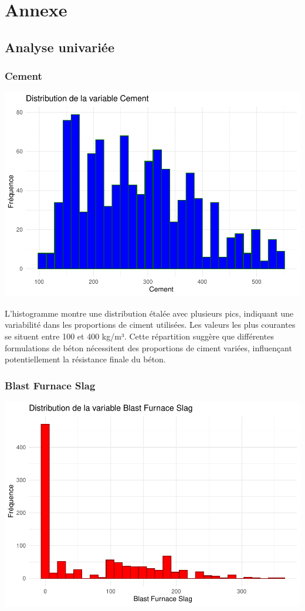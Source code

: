 \documentclass[
  12pt,
]{article}
\begin{document}
\section{Annexe}\label{annexe}

\subsection{Analyse univariée}\label{analyse-univariuxe9e}

\subsubsection{Cement}\label{cement}

\includegraphics{rmd_final_files/figure-latex/unnamed-chunk-1-1.pdf}

L'histogramme montre une distribution étalée avec plusieurs pics,
indiquant une variabilité dans les proportions de ciment utilisées. Les
valeurs les plus courantes se situent entre 100 et 400 kg/m³. Cette
répartition suggère que différentes formulations de béton nécessitent
des proportions de ciment variées, influençant potentiellement la
résistance finale du béton.

\subsubsection{Blast Furnace Slag}\label{blast-furnace-slag}

\includegraphics{rmd_final_files/figure-latex/unnamed-chunk-2-1.pdf}
\end{document}
